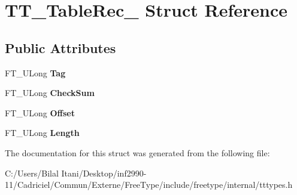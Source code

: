\hypertarget{struct_t_t___table_rec__}{}\section{T\+T\+\_\+\+Table\+Rec\+\_\+ Struct Reference}
\label{struct_t_t___table_rec__}
\subsection*{Public Attributes}
\begin{DoxyCompactItemize}
\item 
F\+T\+\_\+\+U\+Long {\bfseries Tag}\hypertarget{struct_t_t___table_rec___aaccaf9e9d3421fc37fa6e51875534995}{}\label{struct_t_t___table_rec___aaccaf9e9d3421fc37fa6e51875534995}

\item 
F\+T\+\_\+\+U\+Long {\bfseries Check\+Sum}\hypertarget{struct_t_t___table_rec___aacf9207fae3522bb65359c2288900fca}{}\label{struct_t_t___table_rec___aacf9207fae3522bb65359c2288900fca}

\item 
F\+T\+\_\+\+U\+Long {\bfseries Offset}\hypertarget{struct_t_t___table_rec___a91840e1cee040f8da6a34a081dda17b6}{}\label{struct_t_t___table_rec___a91840e1cee040f8da6a34a081dda17b6}

\item 
F\+T\+\_\+\+U\+Long {\bfseries Length}\hypertarget{struct_t_t___table_rec___aa0d3a1f4491bf4418bc26241bdd7d21b}{}\label{struct_t_t___table_rec___aa0d3a1f4491bf4418bc26241bdd7d21b}

\end{DoxyCompactItemize}


The documentation for this struct was generated from the following file\+:\begin{DoxyCompactItemize}
\item 
C\+:/\+Users/\+Bilal Itani/\+Desktop/inf2990-\/11/\+Cadriciel/\+Commun/\+Externe/\+Free\+Type/include/freetype/internal/tttypes.\+h\end{DoxyCompactItemize}
